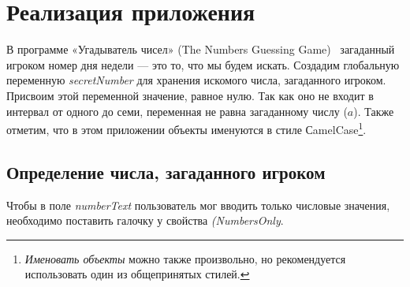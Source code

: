\section{Реализация приложения}
\label{styles}
В программе «Угадыватель чисел» (The Numbers Guessing Game)~\cite{PanfilovaApp} загаданный игроком номер дня недели — это то, что мы будем искать.
Создадим глобальную переменную  \textit{secretNumber} для хранения искомого числа, загаданного игроком. Присвоим этой переменной значение, равное нулю. 
Так как оно не входит в интервал от одного до семи, переменная не равна загаданному числу ($ a $). Также
отметим, что в этом приложении объекты именуются в стиле СamelCase\footnote[][-0cm]{ \emph{Именовать объекты} 
можно также произвольно, но рекомендуется использовать один из общепринятых стилей.
}. 
\subsection{Определение числа, загаданного игроком}
Чтобы в поле \textit{numberText} пользователь мог вводить только числовые значения, необходимо поставить галочку у свойства \textit{(NumbersOnly}.

